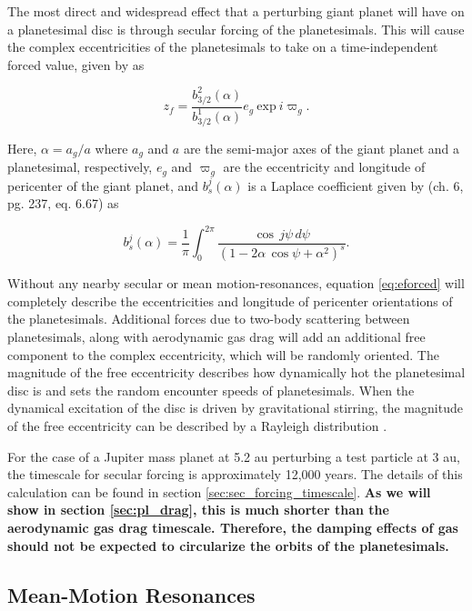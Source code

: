 The most direct and widespread effect that a perturbing giant planet will have on a planetesimal disc is through secular forcing of 
the planetesimals. This will cause the complex eccentricities of the planetesimals to take on a time-independent forced value, 
given by \cite{wyatt99} as

\begin{equation}\label{eq:eforced}
	z_{f} = \frac{b^{2}_{3/2} (\alpha)}{b^{1}_{3/2} (\alpha)} e_{g} ~ \mathrm{exp} ~ i \varpi_{g}.
\end{equation}

\noindent Here, $\alpha = a_{g} / a$ where $a_{g}$ and $a$ are the semi-major axes of the giant planet and a planetesimal, 
respectively, $e_{g}$ and $\varpi_{g}$ are the eccentricity and longitude of pericenter of the giant planet, and $b^{j}_{s} (\alpha)$ 
is a Laplace coefficient given by \cite{murray99} (ch. 6, pg. 237, eq. 6.67) as

\begin{equation}\label{eq:lap}
	b_{s}^{j}(\alpha) = \frac{1}{\pi} \int_{0}^{2 \pi} \frac{\cos \, j \psi \, d \psi}{\left( 1 - 2 \alpha \, \cos \psi + \alpha^2 \right)^{s}}.
\end{equation}

Without any nearby secular or mean motion-resonances, equation \ref{eq:eforced} will completely describe the eccentricities and 
longitude of  pericenter orientations of the planetesimals. Additional forces due to two-body scattering between planetesimals, 
along with aerodynamic gas drag will add an additional free component to the complex eccentricity, which will be randomly 
oriented. The magnitude of the free eccentricity describes how dynamically hot the planetesimal disc is and sets the random 
encounter speeds of planetesimals. When the dynamical excitation of the disc is driven by gravitational stirring, the magnitude of 
the free eccentricity can be described by a Rayleigh distribution \cite{ida92}.

For the case of a Jupiter mass planet at 5.2 au perturbing a test particle at 3 au, the timescale for secular forcing is 
approximately 12,000 years. The details of this calculation can be found in section \ref{sec:sec_forcing_timescale}. \textbf{As we will show in section \ref{sec:pl_drag}, this is much shorter than the aerodynamic gas drag timescale. Therefore, the damping effects of gas should not be expected to circularize the orbits of the planetesimals.}

\subsection{Mean-Motion Resonances}\label{sec:mmr}


